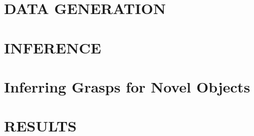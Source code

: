 \documentclass[a4paper, 10pt, conference]{ieeeconf}
\begin{document}
\section{DATA GENERATION}


\section{INFERENCE}
\label{sec:infer}


\section{Inferring Grasps for Novel Objects}
\label{sec:infernovel}


\section{RESULTS}
\label{sec:results}


 


%


\addtolength{\textheight}{-12cm}

%
%
\end{document}
